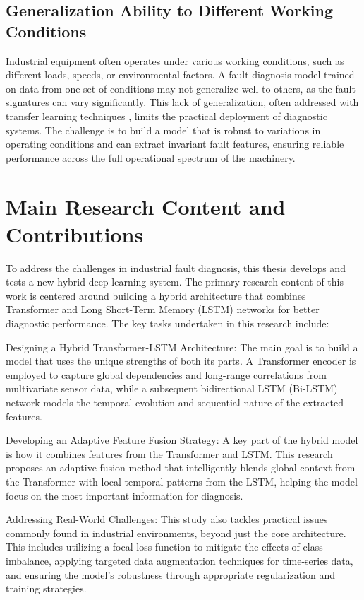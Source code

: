 \subsection{Generalization Ability to Different Working Conditions}
Industrial equipment often operates under various working conditions, such as different loads, speeds, or environmental factors. A fault diagnosis model trained on data from one set of conditions may not generalize well to others, as the fault signatures can vary significantly. This lack of generalization, often addressed with transfer learning techniques \cite{lei2020applications}, limits the practical deployment of diagnostic systems. The challenge is to build a model that is robust to variations in operating conditions and can extract invariant fault features, ensuring reliable performance across the full operational spectrum of the machinery.

\section{Main Research Content and Contributions}
\label{sec:introduction:content_contributions}

To address the challenges in industrial fault diagnosis, this thesis develops and tests a new hybrid deep learning system. The primary research content of this work is centered around building a hybrid architecture that combines Transformer and Long Short-Term Memory (LSTM) networks for better diagnostic performance. The key tasks undertaken in this research include:

Designing a Hybrid Transformer-LSTM Architecture: The main goal is to build a model that uses the unique strengths of both its parts. A Transformer encoder is employed to capture global dependencies and long-range correlations from multivariate sensor data, while a subsequent bidirectional LSTM (Bi-LSTM) network models the temporal evolution and sequential nature of the extracted features.

Developing an Adaptive Feature Fusion Strategy: A key part of the hybrid model is how it combines features from the Transformer and LSTM. This research proposes an adaptive fusion method that intelligently blends global context from the Transformer with local temporal patterns from the LSTM, helping the model focus on the most important information for diagnosis.

Addressing Real-World Challenges: This study also tackles practical issues commonly found in industrial environments, beyond just the core architecture. This includes utilizing a focal loss function to mitigate the effects of class imbalance, applying targeted data augmentation techniques for time-series data, and ensuring the model's robustness through appropriate regularization and training strategies.

